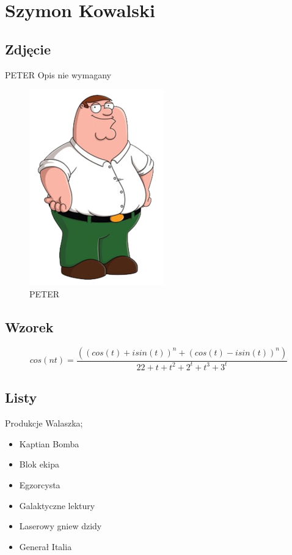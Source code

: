 \section{Szymon Kowalski}
\label{sec;Szymon Kowalski}

\subsection{Zdjęcie}
PETER Opis nie wymagany
\begin{figure}[htbp]
 \centering
 \includegraphics[scale= 0.7]{pictures/PETER.jpg} 
 \caption{PETER }
 \label{fig:PETER}
\end{figure}



\subsection{Wzorek}
\[cos(nt)=\frac{((cos(t)+isin(t))^n+(cos(t)-isin(t))^n)}{22  + t + t^2 + 2^t+t^3 + 3^t}\]

\subsection{Listy}
Produkcje Walaszka;
\begin{itemize}
    \item Kaptian Bomba
    \item Blok ekipa
    \item Egzorcysta
    \item Galaktyczne lektury 
    \item Laserowy gniew dzidy
    \item Generał Italia
\end{itemize}

